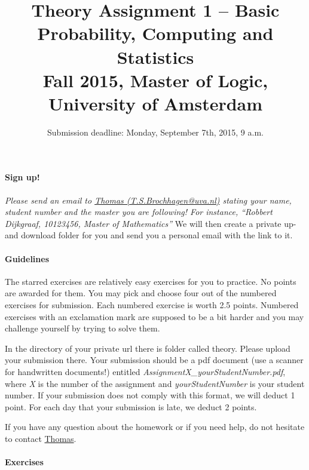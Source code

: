 \documentclass{article}
\title{Theory Assignment 1 -- Basic Probability, Computing and Statistics\\[2mm]
\large{Fall 2015, Master of Logic, University of Amsterdam}}
\author{}
\date{Submission deadline: Monday, September 7th, 2015, 9 a.m.}
\begin{document}
\maketitle

\paragraph{Sign up!} 
\emph{Please send an email to \href{mailto:}{Thomas (T.S.Brochhagen@uva.nl)} stating your name, student number and the master you are following! For instance, ``Robbert Dijkgraaf, 10123456, Master of Mathematics''} We will then create a private up- and download folder for you and send you a personal email with the link to it.

\paragraph{Guidelines}
The starred exercises are relatively easy exercises for you to practice. No points are awarded for them. You may pick and choose four out of the numbered
exercises for submission. Each numbered exercise is worth 2.5 points. Numbered exercises with an exclamation mark are supposed to be a bit harder and you
may challenge yourself by trying to solve them.

In the directory of your private url there is folder called theory. Please upload your submission there. Your submission should be
a pdf document (use a scanner for handwritten documents!) entitled \textit{AssignmentX\_yourStudentNumber.pdf}, where \textit{X} is the number of the
assignment and \textit{yourStudentNumber} is your student number. If your submission does not comply with this format, we will deduct 1 point. For each day that
your submission is late, we deduct 2 points.

If you have any question about the homework or if you need help, do not hesitate to contact \href{mailto:T.S.Brochhagen@uva.nl}{Thomas}.

\paragraph{Exercises}
\end{document}
